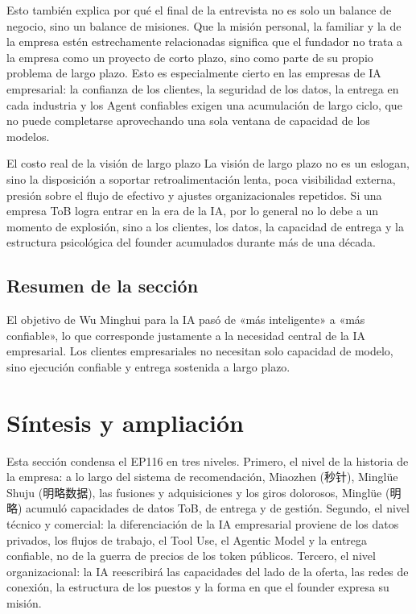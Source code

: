 \documentclass[a4paper]{article}
\begin{document}
Esto también explica por qué el final de la entrevista no es solo un balance de negocio, sino un balance de misiones. Que la misión personal, la familiar y la de la empresa estén estrechamente relacionadas significa que el fundador no trata a la empresa como un proyecto de corto plazo, sino como parte de su propio problema de largo plazo. Esto es especialmente cierto en las empresas de IA empresarial: la confianza de los clientes, la seguridad de los datos, la entrega en cada industria y los Agent confiables exigen una acumulación de largo ciclo, que no puede completarse aprovechando una sola ventana de capacidad de los modelos.

\begin{importantbox}{El costo real de la visión de largo plazo}
La visión de largo plazo no es un eslogan, sino la disposición a soportar retroalimentación lenta, poca visibilidad externa, presión sobre el flujo de efectivo y ajustes organizacionales repetidos. Si una empresa ToB logra entrar en la era de la IA, por lo general no lo debe a un momento de explosión, sino a los clientes, los datos, la capacidad de entrega y la estructura psicológica del founder acumulados durante más de una década.
\end{importantbox}

\subsection{Resumen de la sección}

El objetivo de Wu Minghui para la IA pasó de «más inteligente» a «más confiable», lo que corresponde justamente a la necesidad central de la IA empresarial. Los clientes empresariales no necesitan solo capacidad de modelo, sino ejecución confiable y entrega sostenida a largo plazo.
\section{Síntesis y ampliación}

Esta sección condensa el EP116 en tres niveles. Primero, el nivel de la historia de la empresa: a lo largo del sistema de recomendación, Miaozhen (秒针), Minglüe Shuju (明略数据), las fusiones y adquisiciones y los giros dolorosos, Minglüe (明略) acumuló capacidades de datos ToB, de entrega y de gestión. Segundo, el nivel técnico y comercial: la diferenciación de la IA empresarial proviene de los datos privados, los flujos de trabajo, el Tool Use, el Agentic Model y la entrega confiable, no de la guerra de precios de los token públicos. Tercero, el nivel organizacional: la IA reescribirá las capacidades del lado de la oferta, las redes de conexión, la estructura de los puestos y la forma en que el founder expresa su misión.
\end{document}
